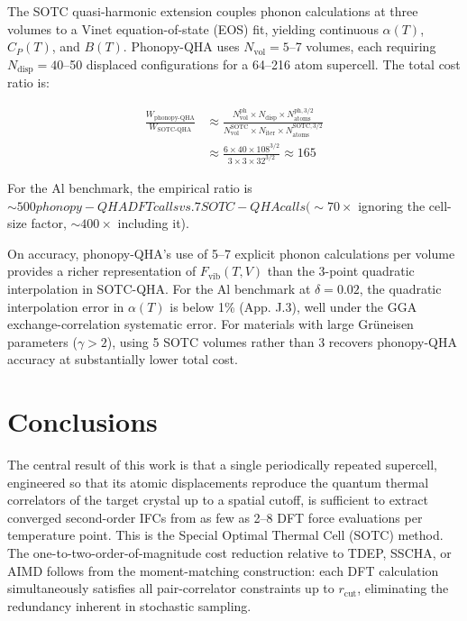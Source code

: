 \documentclass[aps,prb,reprint,amsmath,amssymb,floatfix]{revtex4-2}
\begin{document}
The SOTC quasi-harmonic extension couples phonon calculations at three
volumes to a Vinet equation-of-state (EOS) fit, yielding continuous
\(\alpha(T)\), \(C_P(T)\), and \(B(T)\). Phonopy-QHA \cite{ref45} uses
\(N_\text{vol} = 5\)--7 volumes, each requiring
\(N_\text{disp} = 40\)--50 displaced configurations for a 64--216 atom
supercell. The total cost ratio is:

\begin{align*}
\frac{W_\text{phonopy-QHA}}{W_\text{SOTC-QHA}}
  &\approx \frac{N_\text{vol}^\text{ph} \times N_\text{disp} \times N_\text{atoms}^{\text{ph},3/2}}
             {N_\text{vol}^\text{SOTC} \times N_\text{iter} \times N_\text{atoms}^{\text{SOTC},3/2}} \\
  &\approx \frac{6 \times 40 \times 108^{3/2}}{3 \times 3 \times 32^{3/2}} \approx 165
\end{align*}

For the Al benchmark, the empirical ratio is
$\sim500 phonopy-QHA DFT calls vs. 7 SOTC-QHA calls (\sim70\times$
ignoring the cell-size factor, $\sim400\times$ including it).

On accuracy, phonopy-QHA's use of 5--7 explicit phonon calculations per
volume provides a richer representation of \(F_\text{vib}(T,V)\) than
the 3-point quadratic interpolation in SOTC-QHA. For the Al benchmark at
\(\delta = 0.02\), the quadratic interpolation error in \(\alpha(T)\) is
below 1\% (App. J.3), well under the GGA exchange-correlation systematic
error. For materials with large Grüneisen parameters (\(\gamma > 2\)),
using 5 SOTC volumes rather than 3 recovers phonopy-QHA accuracy at
substantially lower total cost.


\section{Conclusions}\label{conclusions}

The central result of this work is that a single periodically repeated
supercell, engineered so that its atomic displacements reproduce the
quantum thermal correlators of the target crystal up to a spatial
cutoff, is sufficient to extract converged second-order IFCs from as few
as 2--8 DFT force evaluations per temperature point. This is the Special
Optimal Thermal Cell (SOTC) method. The one-to-two-order-of-magnitude
cost reduction relative to TDEP, SSCHA, or AIMD follows from the
moment-matching construction: each DFT calculation simultaneously
satisfies all pair-correlator constraints up to \(r_\text{cut}\),
eliminating the redundancy inherent in stochastic sampling.
\end{document}
